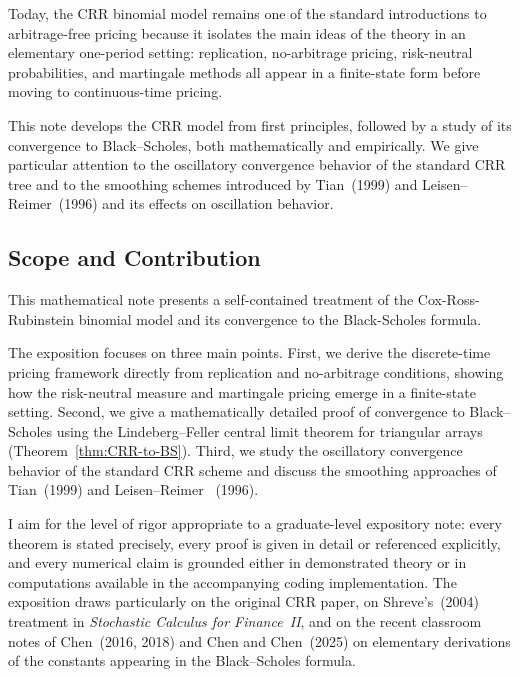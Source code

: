 \documentclass[11pt,a4paper]{article}
\theoremstyle{plain}
\theoremstyle{definition}
\begin{document}
Today, the CRR binomial model remains one of the standard introductions to arbitrage-free pricing because it isolates the main ideas of the theory in an elementary one-period setting: replication, no-arbitrage pricing, risk-neutral probabilities, and martingale methods all appear in a finite-state form before moving to continuous-time pricing.

This note develops the CRR model from first principles, followed by a study of its convergence to Black--Scholes, both mathematically and empirically. We give particular attention to the oscillatory convergence behavior of the standard CRR tree and to the smoothing schemes introduced by Tian~(1999) and Leisen--Reimer~(1996) and its effects on oscillation behavior.

\subsection{Scope and Contribution}

This mathematical note presents a self-contained treatment of the Cox-Ross-Rubinstein binomial model and its convergence to the Black-Scholes formula.

The exposition focuses on three main points. First, we derive the discrete-time pricing framework directly from replication and no-arbitrage conditions, showing how the risk-neutral measure and martingale pricing emerge in a finite-state setting. Second, we give a mathematically detailed proof of convergence to Black--Scholes using the Lindeberg--Feller central limit theorem for triangular arrays (Theorem~\ref{thm:CRR-to-BS}). Third, we study the oscillatory convergence behavior of the standard CRR scheme and discuss the smoothing approaches of Tian~(1999) and Leisen--Reimer ~(1996).

I aim for the level of rigor appropriate to a graduate-level expository note: every theorem is stated precisely, every proof is given in detail or
referenced explicitly, and every numerical claim is grounded either in
demonstrated theory or in computations available in the accompanying coding
implementation. The exposition draws particularly on the original CRR
paper, on Shreve's~(2004) treatment in \emph{Stochastic Calculus for
Finance~II}, and on the recent classroom notes of
Chen~(2016, 2018) and Chen and Chen~(2025) on elementary derivations
of the constants appearing in the Black--Scholes formula.
\end{document}
